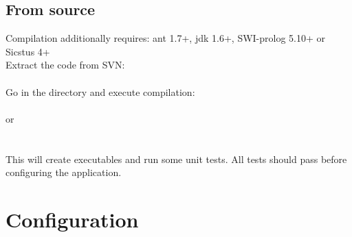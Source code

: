 \documentclass[11pt]{article}
\begin{document}
\subsection{From source}

Compilation additionally requires: ant 1.7+, jdk 1.6+, SWI-prolog 5.10+ or Sicstus 4+\\
Extract the code from SVN:\\
\\
Go in the directory and execute compilation:\\
\\
or \\
\\\\
This will create executables and run some unit tests. All tests should pass before configuring the application.

\section{Configuration}
\end{document}
